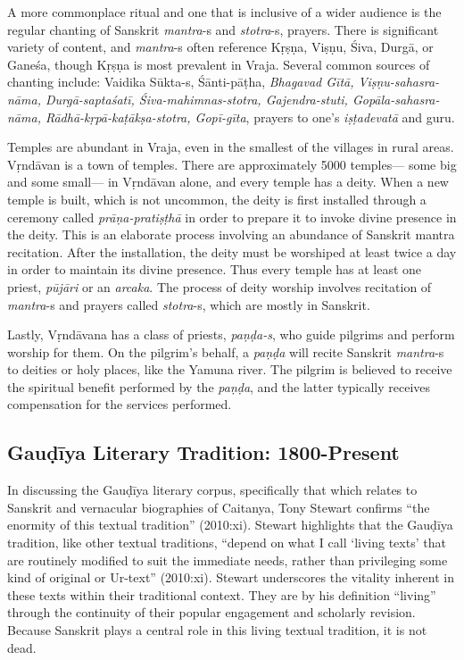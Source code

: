 A more commonplace ritual and one that is inclusive of a wider audience is the regular chanting of Sanskrit {\sl mantra}-s and {\sl stotra}-s, prayers. There is significant variety of content, and {\sl mantra}-s often reference Kṛṣṇa, Viṣṇu, Śiva, Durgā, or Ganeśa, though Kṛṣṇa is most prevalent in Vraja. Several common sources of chanting include: Vaidika Sūkta-s, Śānti-pāṭha, {\sl Bhagavad Gītā, Viṣṇu-sahasra-nāma, Durgā-saptaśatī, Śiva-mahimnas-stotra, Gajendra-stuti, Gopāla-sahasra-nāma, Rādhā-kṛpā-kaṭākṣa-stotra, Gopī-gīta}, prayers to one’s {\sl iṣṭadevatā} and guru. 

Temples are abundant in Vraja, even in the smallest of the villages in rural areas. Vṛndāvan is a town of temples. There are approximately 5000 temples— some big and some small— in Vṛndāvan alone, and every temple has a deity. When a new temple is built, which is not uncommon, the deity is first installed through a ceremony called {\sl prāṇa-pratiṣṭhā} in order to prepare it to invoke divine presence in the deity. This is an elaborate process involving an abundance of Sanskrit mantra recitation. After the installation, the deity must be worshiped at least twice a day in order to maintain its divine presence. Thus every temple has at least one priest, {\sl pūjāri} or an {\sl arcaka}. The process of deity worship involves recitation of {\sl mantra}-s and prayers called {\sl stotra}-s, which are mostly in Sanskrit. 

Lastly, Vṛndāvana has a class of priests, {\sl paṇḍa-s}, who guide pilgrims and perform worship for them. On the pilgrim’s behalf, a {\sl paṇḍa} will recite Sanskrit {\sl mantra}-s to deities or holy places, like the Yamuna river. The pilgrim is believed to receive the spiritual benefit performed by the {\sl paṇḍa}, and the latter typically receives compensation for the services performed.
\vskip -50pt

\subsection*{Gauḍīya Literary Tradition: 1800-Present}

In discussing the Gauḍīya literary corpus, specifically that which relates to Sanskrit and vernacular biographies of Caitanya, Tony Stewart confirms “the enormity of this textual tradition” (2010:xi). Stewart highlights that the Gauḍīya tradition, like other textual traditions, “depend on what I call ‘living texts’ that are routinely modified to suit the immediate needs, rather than privileging some kind of original or Ur-text” (2010:xi). Stewart underscores the vitality inherent in these texts within their traditional context. They are by his definition “living” through the continuity of their popular engagement and scholarly revision. Because Sanskrit plays a central role in this living textual tradition, it is not dead.

